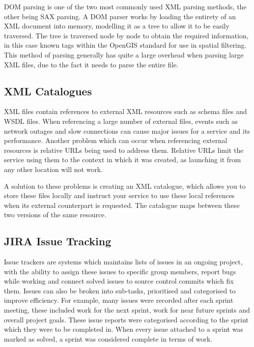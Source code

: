 \documentclass[a4paper, 12pt, twoside]{article}
\begin{document}
DOM parsing is one of the two most commonly used XML parsing methods, the other being SAX parsing. A DOM parser works by loading the entirety of an XML document into memory, modelling it as a tree to allow it to be easily traversed. The tree is traversed node by node to obtain the required information, in this case known tags within the OpenGIS standard for use in spatial filtering. This method of parsing generally has quite a large overhead when parsing large XML files, due to the fact it needs to parse the entire file.

\subsection{XML Catalogues}
\label{sec:bg_catalogues}

XML files contain references to external XML resources such as schema files and WSDL files. When referencing a large number of external files, events such as network outages and slow connections can cause major issues for a service and its performance. Another problem which can occur when referencing external resources is relative URLs being used to address them. Relative URLs limit the service using them to the context in which it was created, as launching it from any other location will not work.

A solution to these problems is creating an XML catalogue, which allows you to store these files locally and instruct your service to use these local references when its external counterpart is requested. The catalogue maps between these two versions of the same resource.

\subsection{JIRA Issue Tracking}
\label{sec:bg_jira}

Issue trackers are systems which maintains lists of issues in an ongoing project, with the ability to assign these issues to specific group members, report bugs while working and connect solved issues to source control commits which fix them. Issues can also be broken into sub-tasks, prioritised and categorised to improve efficiency. For example, many issues were recorded after each sprint meeting, these included work for the next sprint, work for near future sprints and overall project goals. These issue reports were categorised according to the sprint which they were to be completed in. When every issue attached to a sprint was marked as solved, a sprint was considered complete in terms of work.
\end{document}
